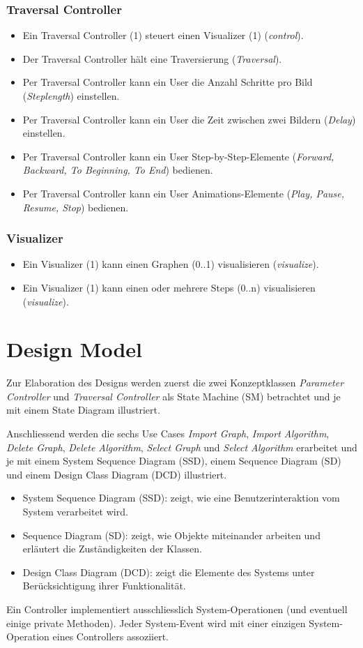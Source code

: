 \subsubsection{Traversal Controller}
\label{subsubsec:Traversal Controller}
\begin{itemize}
  \item Ein Traversal Controller (1) steuert einen Visualizer (1) (\textit{control}).
  \item Der Traversal Controller h\"alt eine Traversierung (\textit{Traversal}).
  \item Per Traversal Controller kann ein User die Anzahl Schritte pro Bild (\textit{Steplength}) einstellen.
  \item Per Traversal Controller kann ein User die Zeit zwischen zwei Bildern (\textit{Delay}) einstellen.
  \item Per Traversal Controller kann ein User Step-by-Step-Elemente (\textit{Forward, Backward, To Beginning, To End}) bedienen.
  \item Per Traversal Controller kann ein User Animations-Elemente (\textit{Play, Pause, Resume, Stop}) bedienen.
\end{itemize}

\subsubsection{Visualizer}
\label{subsubsec:Visualizer}
\begin{itemize}
  \item Ein Visualizer (1) kann einen Graphen (0..1) visualisieren (\textit{visualize}).
  \item Ein Visualizer (1) kann einen oder mehrere Steps (0..n) visualisieren (\textit{visualize}).
\end{itemize}
% 
\section{Design Model}
\label{sec:Design Model}
Zur Elaboration des Designs werden zuerst die zwei Konzeptklassen \textit{Parameter Controller} und \textit{Traversal Controller} als State Machine (SM) betrachtet und je mit einem State Diagram illustriert.

Anschliessend werden die sechs Use Cases \textit{Import Graph}, \textit{Import Algorithm}, \textit{Delete Graph}, \textit{Delete Algorithm}, \textit{Select Graph} und \textit{Select Algorithm} erarbeitet und je mit einem System Sequence Diagram (SSD), einem Sequence Diagram (SD) und einem Design Class Diagram (DCD) illustriert.
\begin{itemize}
  \item System Sequence Diagram (SSD): zeigt, wie eine Benutzerinteraktion vom System verarbeitet wird.
  \item Sequence Diagram (SD): zeigt, wie Objekte miteinander arbeiten und erl\"autert die Zust\"andigkeiten der Klassen. 
  \item Design Class Diagram (DCD): zeigt die Elemente des Systems unter Ber\"ucksichtigung ihrer Funktionalit\"at.
\end{itemize}

Ein Controller implementiert ausschliesslich System-Operationen (und eventuell einige private Methoden). Jeder System-Event wird mit einer einzigen System-Operation eines Controllers assoziiert.